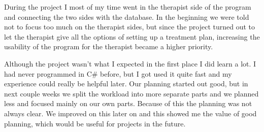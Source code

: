 During the project I most of my time went in the therapist side of the program and connecting the two sides with the database. In the beginning we were told not to focus too much on the therapist sides, but since the project turned out to let the therapist give all the options of setting up a treatment plan, increasing the usability of the program for the therapist became a higher priority.

Although the project wasn't what I expected in the first place I did learn a lot. I had never programmed in C\# before, but I got used it quite fast and my experience could really be helpful later.
Our planning started out good, but in next couple weeks we split the workload into more separate parts and we planned less and focused mainly on our own parts. Because of this the planning was not always clear. We improved on this later on and this showed me the value of good planning, which would be useful for projects in the future.

